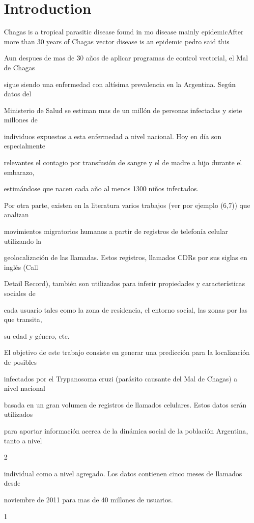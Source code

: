 \section{Introduction}

Chagas is a tropical parasitic disease found in mo disease mainly epidemicAfter more than 30 years of Chagas vector  disease is an epidemic pedro said this 

Aun despues de mas de 30 años de aplicar programas de control vectorial, el Mal de Chagas

sigue siendo una enfermedad con altísima prevalencia en la Argentina. Según datos del

Ministerio de Salud se estiman mas de un millón de personas infectadas y siete millones de

individuos expuestos a esta enfermedad a nivel nacional. Hoy en día son especialmente

relevantes el contagio por transfusión de sangre y el de madre a hijo durante el embarazo,

estimándose que nacen cada año al menos 1300 niños infectados.

Por otra parte, existen en la literatura varios trabajos (ver por ejemplo (6,7)) que analizan

movimientos migratorios humanos a partir de registros de telefonía celular utilizando la

geolocalización de las llamadas. Estos registros, llamados CDRs por sus siglas en inglés (Call

Detail Record), también son utilizados para inferir propiedades y características sociales de

cada usuario tales como la zona de residencia, el entorno social, las zonas por las que transita,

su edad y género, etc.

El objetivo de este trabajo consiste en generar una predicción para la localización de posibles

infectados por el Trypanosoma cruzi (parásito causante del Mal de Chagas) a nivel nacional

basada en un gran volumen de registros de llamados celulares. Estos datos serán utilizados

para aportar información acerca de la dinámica social de la población Argentina, tanto a nivel

2

individual como a nivel agregado. Los datos contienen cinco meses de llamados desde

noviembre de 2011 para mas de 40 millones de usuarios.

1

